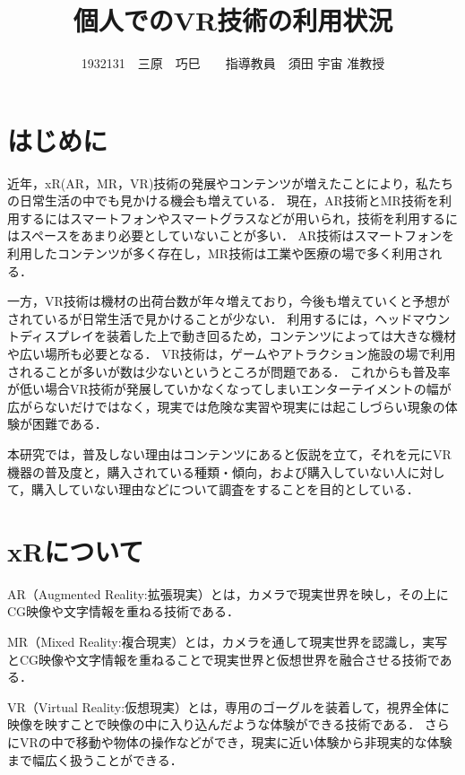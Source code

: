 \documentclass[twocolumn,10pt,a4j]{ltjsarticle}
\title{個人でのVR技術の利用状況}
\author{1932131　三原　巧巳　　指導教員　須田 宇宙 准教授}
\date{}
\begin{document}
\maketitle

\section{はじめに}
近年，xR(AR，MR，VR)技術の発展やコンテンツが増えたことにより，私たちの日常生活の中でも見かける機会も増えている．
現在，AR技術とMR技術を利用するにはスマートフォンやスマートグラスなどが用いられ，技術を利用するにはスペースをあまり必要としていないことが多い．
AR技術はスマートフォンを利用したコンテンツが多く存在し，MR技術は工業や医療の場で多く利用される．

一方，VR技術は機材の出荷台数が年々増えており，今後も増えていくと予想がされているが日常生活で見かけることが少ない\cite{VRの機材の出荷台数}．
利用するには，ヘッドマウントディスプレイを装着した上で動き回るため，コンテンツによっては大きな機材や広い場所も必要となる．
VR技術は，ゲームやアトラクション施設の場で利用されることが多いが数は少ないというところが問題である．
これからも普及率が低い場合VR技術が発展していかなくなってしまいエンターテイメントの幅が広がらないだけではなく，現実では危険な実習や現実には起こしづらい現象の体験が困難である．

本研究では，普及しない理由はコンテンツにあると仮説を立て，それを元にVR機器の普及度と，購入されている種類・傾向，および購入していない人に対して，購入していない理由などについて調査をすることを目的としている．

\section{xRについて}
AR（Augmented Reality:拡張現実）とは，カメラで現実世界を映し，その上にCG映像や文字情報を重ねる技術である．

MR（Mixed Reality:複合現実）とは，カメラを通して現実世界を認識し，実写とCG映像や文字情報を重ねることで現実世界と仮想世界を融合させる技術である．

VR（Virtual Reality:仮想現実）とは，専用のゴーグルを装着して，視界全体に映像を映すことで映像の中に入り込んだような体験ができる技術である．
さらにVRの中で移動や物体の操作などができ，現実に近い体験から非現実的な体験まで幅広く扱うことができる．
\end{document}
